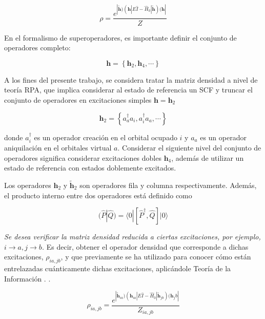 \documentclass[
	12pt, %
]{fphw}
\begin{document}
\begin{equation}\label{rho}
	\rho = \frac{e^{| \bm{\widetilde{h}} ) (\bm{h}| E \hat{I} - \hat{H}_0 | \bm{\widetilde{h}} )   (\bm{h}|}}
	{Z}
\end{equation}


 
En el formalismo de superoperadores, es importante definir el conjunto de operadores completo:

\begin{equation}
	\bm{h} =    \left\{ \bm{h}_2, \bm{h}_4, \cdots \right\} 
\end{equation}

A los fines del presente trabajo, se considera tratar la matriz densidad a nivel de teoría RPA, 
que implica considerar al estado de referencia un SCF 
y truncar el conjunto de operadores en excitaciones simples \cite{Revieww} $ \bm{h} = \bm{h}_2 $ 


\begin{equation}
	\bm{h}_2 = \left\{a^\dagger_a a_i, a^\dagger_i a_a, \cdots\right\}
\end{equation}

donde $a^\dagger_i$ es un operador creación en el orbital ocupado $i$ y 
$a_a$ es un operador aniquilación en el orbitales virtual $a$. 
Considerar el siguiente nivel del conjunto de operadores significa considerar excitaciones dobles $\bm{h}_4$, 
además de utilizar un estado de referencia con estados doblemente excitados.
  




Los operadores $ \bm{h}_2 $ y $ \bm{\widetilde{h}}_2 $ son operadores 
fila y columna respectivamente. Además, el producto interno entre dos operadores está definido como 

\begin{equation}
	(\hat{P}|\hat{Q}) = \langle 0 | [\hat{P}^\dagger ,\hat{Q}] |0 \rangle
\end{equation}


\textit{Se desea verificar la matriz densidad reducida a ciertas excitaciones, por ejemplo, $i\rightarrow a,j\rightarrow b$.}
Es decir, obtener el operador densidad que corresponde a dichas excitaciones, $\rho_{ia,jb}$, y que previamente se ha utilizado
para conocer cómo están entrelazadas cuánticamente dichas excitaciones, aplicándole Teoría de la Información .\cite{Millan}
 \cite{JCP}.

 \begin{equation*}
	 \rho_{ia,jb} =  \frac{e^{| \bm{\widetilde{h}}_{ia} ) (\bm{h}_{ia}| E \hat{I} - \hat{H}_0 | \bm{\widetilde{h}}_{jb} )   (\bm{h}_jb|}}
	 {Z_{ia,jb}}
 \end{equation*}
\end{document}

